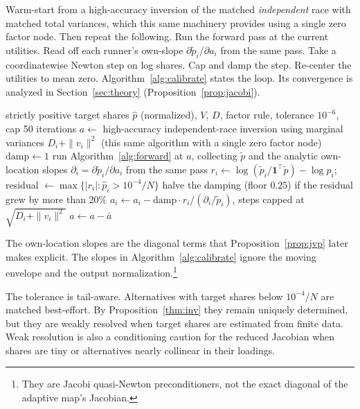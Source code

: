 \documentclass[12pt]{article}
\theoremstyle{remark}
\begin{document}
Warm-start from a high-accuracy inversion of
the matched \emph{independent} race with matched total variances, which this
same machinery provides using a single zero factor node. Then repeat the following. Run
the forward pass at the current utilities. Read off each runner's
own-slope $\partial \tilde p_i / \partial a_i$ from the same pass. Take a coordinatewise Newton step on log
shares. Cap and damp the step. Re-center the utilities to mean zero.
Algorithm~\ref{alg:calibrate} states the loop. Its convergence is
analyzed in Section~\ref{sec:theory} (Proposition~\ref{prop:jacobi}).

\begin{algorithm}[H]
\caption{Calibration (damped Jacobi quasi-Newton)}
\label{alg:calibrate}
\begin{algorithmic}[1]
\Require strictly positive target shares $\hat p$ (normalized), $V$, $D$,
factor rule, tolerance $10^{-6}$, cap 50 iterations
\State $a \gets$ high-accuracy independent-race inversion using
marginal variances $D_i + \|v_i\|^2$ (this same algorithm with a
single zero factor node) 
\State $\mathrm{damp} \gets 1$
\Repeat
  \State run Algorithm~\ref{alg:forward} at $a$, collecting $\tilde p$
  and the analytic own-location slopes $\partial_i = \partial \tilde
  p_i / \partial a_i$ from the same pass
  \State $r_i \gets \log(\tilde p_i / \mathbf{1}^\top \tilde p) -
  \log \hat p_i$; residual $\gets \max\{|r_i| : \hat p_i >
  10^{-4}/N\}$
  \State halve the damping (floor $0.25$) if the residual grew by more
  than 20\%
  \State $a_i \gets a_i - \mathrm{damp} \cdot r_i / (\partial_i /
  \tilde p_i)$, steps capped at $\sqrt{D_i + \|v_i\|^2}$
  \State $a \gets a - \bar a$ 
\end{algorithmic}
\end{algorithm}

The own-location slopes are the diagonal terms that
Proposition~\ref{prop:jvp} later makes explicit. The slopes in
Algorithm~\ref{alg:calibrate} ignore the moving envelope and the output
normalization.\footnote{They are Jacobi quasi-Newton preconditioners,
not the exact diagonal of the adaptive map's Jacobian.}

The tolerance is tail-aware. Alternatives with target shares below
$10^{-4}/N$ are matched best-effort. By Proposition~\ref{thm:inv} they
remain uniquely determined, but they are weakly resolved when target
shares are estimated from finite data.
Weak resolution is also a conditioning caution for the reduced
Jacobian when shares are tiny or alternatives nearly collinear in their
loadings.
\end{document}
